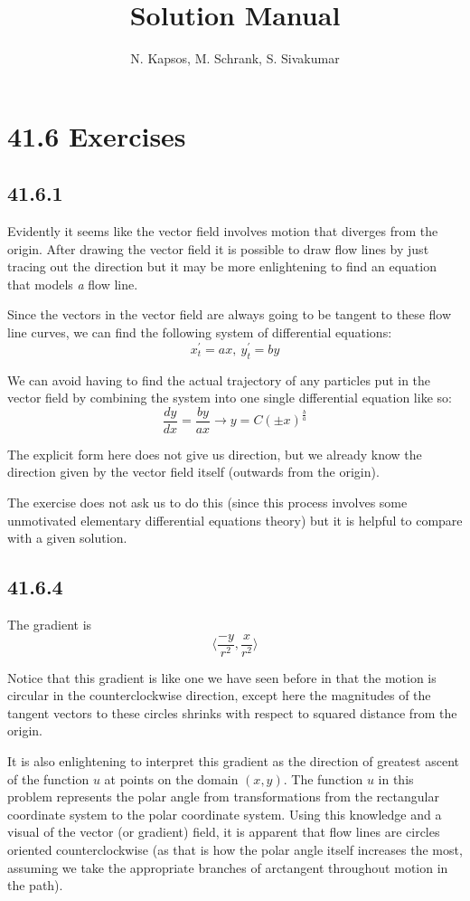 \documentclass{article}
\title{Solution Manual}
\author{N. Kapsos, M. Schrank, S. Sivakumar}
\date{}
\begin{document}
\maketitle
\setcounter{secnumdepth}{0}

\section{41.6 Exercises}

\subsection{41.6.1}

Evidently it seems like the vector field involves motion that diverges from the origin. After drawing the vector field it is possible to draw flow lines by just tracing out the direction but it may be more enlightening to find an equation that models \textit{a} flow line.

Since the vectors in the vector field are always going to be tangent to these flow line curves, we can find the following system of differential equations:
$$x^{\prime}_t = ax,~ y^{\prime}_t = by$$

We can avoid having to find the actual trajectory of any particles put in the vector field by combining the system into one single differential equation like so:
$$\frac{dy}{dx} = \frac{by}{ax} \to y = C(\pm x)^{\frac{b}{a}}$$

The explicit form here does not give us direction, but we already know the direction given by the vector field itself (outwards from the origin).

The exercise does not ask us to do this (since this process involves some unmotivated elementary differential equations theory) but it is helpful to compare with a given solution.

\subsection{41.6.4}

The gradient is $$\bigg\langle \frac{-y}{r^2},\frac{x}{r^2} \bigg\rangle$$

Notice that this gradient is like one we have seen before in that the motion is circular in the counterclockwise direction, except here the magnitudes of the tangent vectors to these circles shrinks with respect to squared distance from the origin.

It is also enlightening to interpret this gradient as the direction of greatest ascent of the function $u$ at points on the domain $(x,y)$. The function $u$ in this problem represents the polar angle from transformations from the rectangular coordinate system to the polar coordinate system. Using this knowledge and a visual of the vector (or gradient) field, it is apparent that flow lines are circles oriented counterclockwise (as that is how the polar angle itself increases the most, assuming we take the appropriate branches of arctangent throughout motion in the path).
\end{document}
